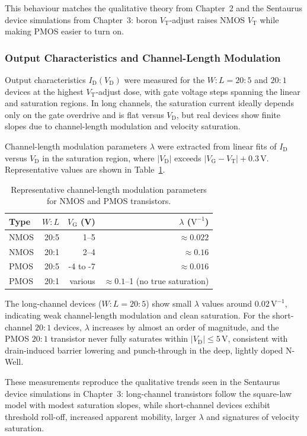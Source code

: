 This behaviour matches the qualitative theory from Chapter~2 and the Sentaurus device simulations from Chapter~3: boron $V_\mathrm{T}$-adjust raises NMOS $V_\mathrm{T}$ while making PMOS easier to turn on.

\subsubsection{Output Characteristics and Channel-Length Modulation}

Output characteristics $I_\mathrm{D}(V_\mathrm{D})$ were measured for the $W:L = 20:5$ and $20:1$ devices at the highest $V_\mathrm{T}$-adjust dose, with gate voltage steps spanning the linear and saturation regions. In long channels, the saturation current ideally depends only on the gate overdrive and is flat versus $V_\mathrm{D}$, but real devices show finite slopes due to channel-length modulation and velocity saturation.

Channel-length modulation parameters $\lambda$ were extracted from linear fits of $I_\mathrm{D}$ versus $V_\mathrm{D}$ in the saturation region, where $|V_\mathrm{D}|$ exceeds $|V_\mathrm{G} - V_\mathrm{T}| + 0.3$\,V. Representative values are shown in Table~\ref{tab:ch7-lambda}.

\begin{table}[htbp]
  \centering
  \caption{Representative channel-length modulation parameters for NMOS and PMOS transistors.}
  \label{tab:ch7-lambda}
  \begin{tabular}{lrrr}
    \toprule
    Type & $W:L$ & $V_\mathrm{G}$ (V) & $\lambda$ ($\mathrm{V}^{-1}$) \\
    \midrule
    NMOS & 20:5 & 1--5   & $\approx 0.022$ \\
    NMOS & 20:1 & 2--4   & $\approx 0.16$ \\
    PMOS & 20:5 & -4 to -7 & $\approx 0.016$ \\
    PMOS & 20:1 & various  & $\approx 0.1$--1 (no true saturation) \\
    \bottomrule
  \end{tabular}
\end{table}

The long-channel devices ($W:L = 20:5$) show small $\lambda$ values around $0.02\,\mathrm{V}^{-1}$, indicating weak channel-length modulation and clean saturation. For the short-channel $20:1$ devices, $\lambda$ increases by almost an order of magnitude, and the PMOS $20:1$ transistor never fully saturates within $|V_\mathrm{D}| \le 5$\,V, consistent with drain-induced barrier lowering and punch-through in the deep, lightly doped N-Well.

These measurements reproduce the qualitative trends seen in the Sentaurus device simulations in Chapter~3: long-channel transistors follow the square-law model with modest saturation slopes, while short-channel devices exhibit threshold roll-off, increased apparent mobility, larger $\lambda$ and signatures of velocity saturation.